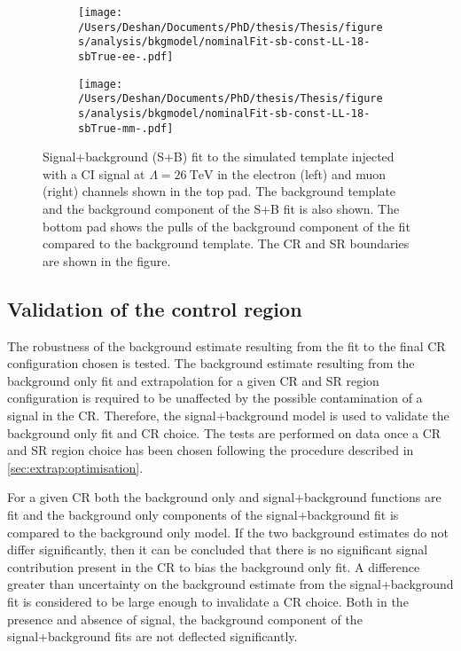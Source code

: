 \begin{figure}[h!]
    \centering
    \begin{subfigure}[b]{0.49\textwidth}
        \centering
        \texttt{[image: /Users/Deshan/Documents/PhD/thesis/Thesis/figures/analysis/bkgmodel/nominalFit-sb-const-LL-18-sbTrue-ee-.pdf]}
        \label{fig:bkgmodel:sbfits1}
    \end{subfigure}
    \begin{subfigure}[b]{0.49\textwidth}
        \centering
        \texttt{[image: /Users/Deshan/Documents/PhD/thesis/Thesis/figures/analysis/bkgmodel/nominalFit-sb-const-LL-18-sbTrue-mm-.pdf]}
        \label{fig:bkgmodel:sbfits2}
    \end{subfigure}
    \caption[Signal+Background fits to the signal+background template in the electron and muon channels]{Signal+background (S+B) fit to the simulated template injected with a CI signal at $\Lambda = \SI{26}{\tera\electronvolt}$ in the electron (left) and muon (right) channels shown in the top pad. The background template and the background component of the S+B fit is also shown. The bottom pad shows the pulls of the background component of the fit compared to the background template. The CR and SR boundaries are shown in the figure.}
    \label{fig:bkgmodel:sbfits}
\end{figure}

\subsection{Validation of the control region}
The robustness of the background estimate resulting from the fit to the final CR configuration chosen is tested. The background estimate resulting from the background only fit and extrapolation for a given CR and SR region configuration is required to be unaffected by the possible contamination of a signal in the CR. Therefore, the signal+background model is used to validate the background only fit and CR choice. The tests are performed on data once a CR and SR region choice has been chosen following the procedure described in \cref{sec:extrap:optimisation}. 

For a given CR both the background only and signal+background functions are fit and the background only components of the signal+background fit is compared to the background only model. If the two background estimates do not differ significantly, then it can be concluded that there is no significant signal contribution present in the CR to bias the background only fit. A difference greater than uncertainty on the background estimate from the signal+background fit is considered to be large enough to invalidate a CR choice. Both in the presence and absence of signal, the background component of the signal+background fits are not deflected significantly. 

